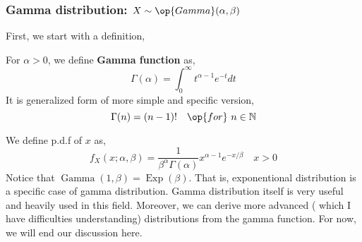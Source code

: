 \subsubsection*{Gamma distribution: $X \sim \op{Gamma} (\alpha, \beta)$}
First, we start with a definition,
\begin{definition}
    For $\alpha > 0$, we define \textbf{Gamma function} as,
    \[\Gamma(\alpha) = \int_{0}^{\infty} t^{\alpha-1} e^{-t}dt\]
    It is generalized form of more simple and specific version,
    \[ \Gamma(n) = (n-1)! \quad \op{for} \ n \in \mathbb{N} \]
\end{definition}
We define p.d.f of $x$ as,
\[f_X(x; \alpha, \beta) =  \frac{1}{\beta^{\alpha} \Gamma(\alpha)} x^{\alpha-1} e^{-x/ \beta} \quad x > 0\]
Notice that $ \operatorname{Gamma}(1, \beta) =\operatorname{Exp}( \beta)$. That is, exponentional distribution is a specific case of gamma
distribution.
Gamma distribution itself is very useful and heavily used in this field. Moreover, we can derive more advanced ( which I have difficulties
understanding) distributions from the gamma function. For now, we will end our discussion here.

